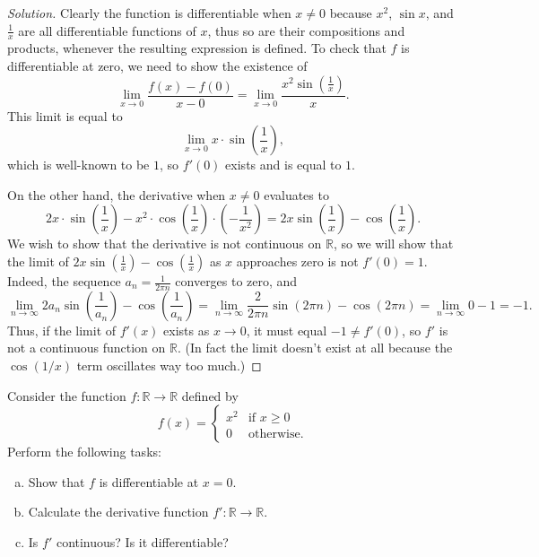 \documentclass[11pt]{scrartcl}
\providecommand{\RR}{\mathbb R}
\providecommand{\ii}{\item}
\newenvironment{soln}{\begin{proof}[Solution]}{\end{proof}}
\begin{document}
\begin{soln}
	Clearly the function is differentiable when $x\ne 0$
	because $x^2$, $\sin x$, and $\frac 1x$ are
	all differentiable functions of $x$, thus so are their compositions
	and products, whenever the resulting expression is defined.
	To check that $f$ is differentiable at zero, we need
	to show the existence of
	\[\lim_{x\to 0} \frac{f(x) - f(0)}{x - 0}
	= \lim_{x\to 0} \frac{x^2\sin(\frac1x)}{x}.\]
	This limit is equal to
	\[\lim_{x\to0} x\cdot\sin\left(\frac 1x\right),\]
	which is well-known to be $1$, so $f'(0)$ exists and is equal to $1$.
	
	On the other hand, the derivative when $x\ne 0$ evaluates to
	\[2x\cdot \sin\left(\frac 1x\right)
	- x^2\cdot\cos\left(\frac1x\right)\cdot\left(-\frac{1}{x^2}\right)
	= 2x\sin\left(\frac1x\right) - \cos\left(\frac1x\right).\]
	We wish to show that the derivative is not continuous on $\RR$,
	so we will show that the limit of $2x\sin(\frac1x) - \cos(\frac1x)$
	as $x$ approaches zero is not $f'(0) = 1$.
	Indeed, the sequence $a_n = \frac{1}{2\pi n}$ converges to zero, and
	\[\lim_{n\to\infty} 2a_n \sin\left(\frac 1{a_n}\right)
	- \cos\left(\frac1{a_n}\right)
	= \lim_{n\to\infty} \frac{2}{2\pi n}\sin(2\pi n) - \cos(2\pi n)
	= \lim_{n\to\infty} 0 - 1 = -1.\]
	Thus, if the limit of $f'(x)$ exists as $x\to 0$,
	it must equal $-1\ne f'(0)$, so $f'$ is not a continuous function on $\RR$.
	(In fact the limit doesn't exist at all because the $\cos(1/x)$
	term oscillates way too much.)
\end{soln}

\begin{problem}
	Consider the function $f\colon\RR\to\RR$ defined by
	\[f(x) = \begin{cases}
		x^2 & \text{if }x\ge 0\\
		0 &\text{otherwise}.
	\end{cases}\]
	Perform the following tasks:
	\begin{enumerate}[(a)]
		\ii Show that $f$ is differentiable at $x = 0$.
		\ii Calculate the derivative function $f'\colon\RR\to\RR$.
		\ii Is $f'$ continuous? Is it differentiable?
	\end{enumerate}
\end{problem}
\end{document}
